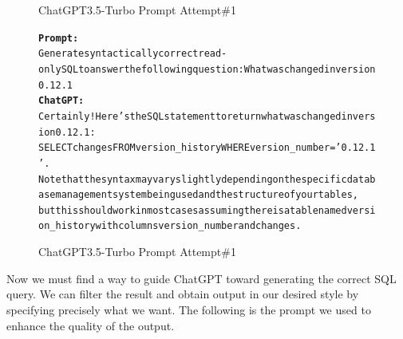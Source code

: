 \begin{figure}[H]
    \begin{AIbox}{ChatGPT3.5-Turbo Prompt Attempt\#1}
        \vspace{-5px}
        \parbox{1\textwidth}{\scriptsize
            \begin{alltt} \larger
                {\bf Prompt:} \\
                Generate syntactically correct read-only SQL to answer the following question: What was changed in version 0.12.1
                \\
                {\bf ChatGPT:} \\
                Certainly! Here's the SQL statement to return what was changed in version 0.12.1:\\
                SELECT changes FROM version\_history WHERE version\_number = '0.12.1'. \\ Note that the syntax may vary slightly depending on the specific database management system being used and the structure of your tables,\\ but this should work in most cases assuming there is a table named version\_history with columns version\_number and changes.
            \end{alltt}
        }
        \vspace{-5px}
    \end{AIbox}
    \caption{ChatGPT3.5-Turbo Prompt Attempt\#1}
\end{figure}

Now we must find a way to guide ChatGPT toward generating the correct SQL query. We can filter the result and obtain output in our desired style by specifying precisely what we want. The following is the prompt we used to enhance the quality of the output.

